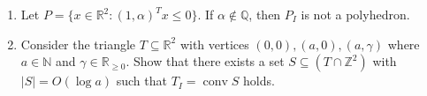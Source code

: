 \documentclass[11pt,a4paper]{article}
\DeclareMathOperator{\conv}{conv}
\begin{document}
\begin{enumerate}
\item Let $P = \{ x ∈ ℝ^2 : (1,α)^T x ≤ 0\}$. If $α ∉ ℚ$, then $P_I$ is not a polyhedron.





\item Consider the triangle $T ⊆ ℝ^2$ with vertices $(0,0), (a,0), (a, γ)$  where $a ∈ ℕ$ and $γ ∈ ℝ_{≥0}$. Show that there exists a set $S⊆ (T ∩ℤ^2)$ with $|S| = O(\log a)$ such that $T_I = \conv{S}$ holds.

\end{enumerate}



%
%


 
\end{document}
